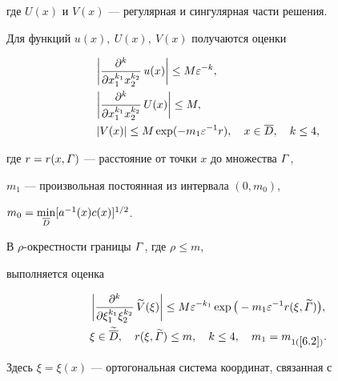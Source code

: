 где $U(x)$ и $V(x)$ --- регулярная и сингулярная части решения.





Для функций $u(x),\ U(x),\ V(x)$ получаются оценки


\begin{align}


\label{6.2}


&\bigg|\frac{\partial^{k}}{\partial x_1^{k_1}x_2^{k_2}}\,


u(x)\bigg| \leq M \eps^{-k},\\


%


&\bigg|\frac{\partial^{k}}{\partial x_1^{k_1}x_2^{k_2}}\,


U(x)\bigg| \leq  M, \notag \\


%


&|V(x)| \leq M\exp(-m_1\eps^{-1}r),


\quad x\in\Db, \quad k\leq 4, \notag


\end{align}


где $r=r(x,\varGamma)$ --- расстояние от точки $x$ до множества $\varGamma$, 


$m_1$ ---  произвольная постоянная из интервала $(0,m_0)$, 


$m_0=\min\limits_{\overline{D}}[a^{-1}(x)c(x)]^{1/2}$.





\medskip


В $\rho$-окрестности границы $\varGamma$, где $\rho\le m$,


выполняется оценка


\begin{gather}


\label{6.3}


\bigg|\frac{\partial^{k}}{\partial \xi_1^{k_1}\xi_2^{k_2}}\,


\widetilde{V}(\xi)\bigg| \leq M\eps^{-k_1}


\exp\big(-m_1\eps^{-1}r(\xi,\widetilde{\G})\big),\\


%


\xi\in \widetilde{\Db}, \quad r(\xi,\widetilde{\G})\le m,


\quad k\le 4, \quad m_1=m_{1(\ref{6.2})}. \notag


\end{gather}


Здесь $\xi=\xi(x)$ --- ортогональная система координат, связанная с


